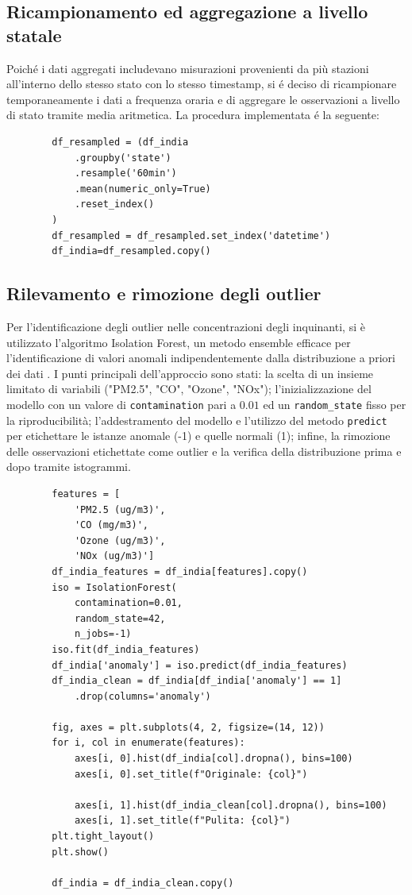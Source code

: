 \documentclass[a4paper,12pt]{report}
\begin{document}
	\subsection{Ricampionamento ed aggregazione a livello statale}
	Poiché i dati aggregati includevano misurazioni provenienti da più stazioni all'interno dello stesso stato con lo stesso timestamp, si é deciso di ricampionare temporaneamente i dati a frequenza oraria e di aggregare le osservazioni a livello di stato tramite media aritmetica. La procedura implementata é la seguente:
	
	\begin{verbatim}
		df_resampled = (df_india
			.groupby('state')
			.resample('60min')
			.mean(numeric_only=True)
			.reset_index()
		)
		df_resampled = df_resampled.set_index('datetime')
		df_india=df_resampled.copy()
	\end{verbatim}
	
	\subsection{Rilevamento e rimozione degli outlier}
	Per l'identificazione degli outlier nelle concentrazioni degli inquinanti, si è utilizzato l'algoritmo Isolation Forest, un metodo ensemble efficace per l'identificazione di valori anomali indipendentemente dalla distribuzione a priori dei dati \cite{liu2009iforest}. I punti principali dell'approccio sono stati: la scelta di un insieme limitato di variabili ("PM2.5", "CO", "Ozone", "NOx"); l'inizializzazione del modello con un valore di \texttt{contamination} pari a $0.01$ ed un \texttt{random\_state} fisso per la riproducibilità; l'addestramento del modello e l'utilizzo del metodo \texttt{predict} per etichettare le istanze anomale (-1) e quelle normali (1); infine, la rimozione delle osservazioni etichettate come outlier e la verifica della distribuzione prima e dopo tramite istogrammi.
	
	\begin{verbatim}
		features = [
			'PM2.5 (ug/m3)', 
			'CO (mg/m3)', 
			'Ozone (ug/m3)', 
			'NOx (ug/m3)']
		df_india_features = df_india[features].copy()
		iso = IsolationForest(
			contamination=0.01, 
			random_state=42, 
			n_jobs=-1)
		iso.fit(df_india_features)
		df_india['anomaly'] = iso.predict(df_india_features)
		df_india_clean = df_india[df_india['anomaly'] == 1]
			.drop(columns='anomaly')
		
		fig, axes = plt.subplots(4, 2, figsize=(14, 12))
		for i, col in enumerate(features):
			axes[i, 0].hist(df_india[col].dropna(), bins=100)
			axes[i, 0].set_title(f"Originale: {col}")

			axes[i, 1].hist(df_india_clean[col].dropna(), bins=100)
			axes[i, 1].set_title(f"Pulita: {col}")
		plt.tight_layout()
		plt.show()
		
		df_india = df_india_clean.copy()
	\end{verbatim}
	
\end{document}
